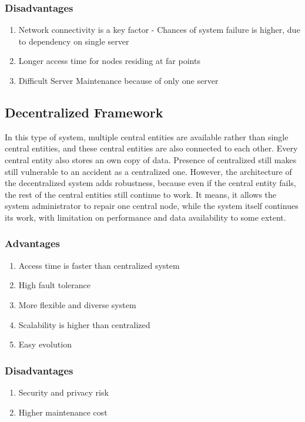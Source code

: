\documentclass[a4paper,twoside,12pt]{report}
\begin{document}
\begin{spacing}{1.5}
\subsubsection{Disadvantages}
	\begin{enumerate}
	\item{Network connectivity is a key factor - Chances of system failure is higher, due to dependency on single server}
	\item{Longer access time for nodes residing at far points}
	\item{Difficult Server Maintenance because of only one server}
\end{enumerate}	 
\subsection{Decentralized Framework}
In this type of system, multiple central entities are available rather than single central entities, and these central entities are also connected to each other. Every central entity also stores an own copy of data. Presence of centralized still makes still vulnerable to an accident as a centralized one. However, the architecture of the decentralized system adds robustness, because even if the central entity fails, the rest of the central entities still continue to work. It means, it allows the system administrator to repair one central node, while the system itself continues its work, with limitation on performance and data availability to some extent.   
\subsubsection{Advantages}
\begin{enumerate}
	\item{Access time is faster than centralized system}
	\item{High fault tolerance}
	\item{More flexible and diverse system}
	\item{Scalability is higher than centralized}
	\item{Easy evolution}
\end{enumerate}
\subsubsection{Disadvantages}
\begin{enumerate}
	\item{Security and privacy risk}
	\item{Higher maintenance cost}
\end{enumerate}

\end{spacing}
\end{document}
